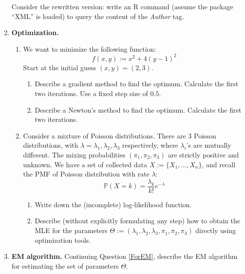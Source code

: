 \documentclass[11pt]{article}
\newcommand{\pr}{\mathbb{P}}
\begin{document}
\begin{enumerate}
\begin{verbatim}
	\end{verbatim}
	Consider the rewritten version: write an R command (assume the package ``XML'' is loaded) to query the content of the \emph{Author} tag.
	\item {\bf Optimization.}
	\begin{enumerate}
		\item We want to minimize the following function:
		$$
		f(x, y) := x^2 + 4(y-1)^2
		$$
		Start at the initial guess $(x,y)=(2, 3)$.
		\begin{enumerate}
			\item Describe a gradient method to find the optimum. Calculate the first two iterations. Use a fixed step size of $0.5$.
			\item Describe a Newton's method to find the optimum. Calculate the first two iterations.
		\end{enumerate}
		\item\label{ForEM} Consider a mixture of Poisson distributions. There are 3 Poisson distributions, with $\lambda=\lambda_1, \lambda_2, \lambda_3$ respectively, where $\lambda_i$'s are mutually different. The mixing probabilities $(\pi_1, \pi_2, \pi_3)$ are strictly positive and unknown. We have a set of collected data $X:=\{ X_1,\ldots,X_n \}$, and recall the PMF of Poisson distribution with rate $\lambda$:
		$$
			\pr\left(X=k\right) = \frac{\lambda_k}{k!}e^{-\lambda}
		$$
		\begin{enumerate}
			\item Write down the (incomplete) log-likelihood function.
			\item Describe (without explicitly formulating any step) how to obtain the MLE for the parameters $\Theta:=(\lambda_1, \lambda_2, \lambda_3, \pi_1, \pi_2, \pi_3)$ directly using optimization tools.
		\end{enumerate}
	\end{enumerate}
	\item {\bf EM algorithm.} Continuing Question \ref{ForEM}, describe the EM algorithm for estimating the set of parameters $\Theta$.
\end{enumerate}
\end{document}
